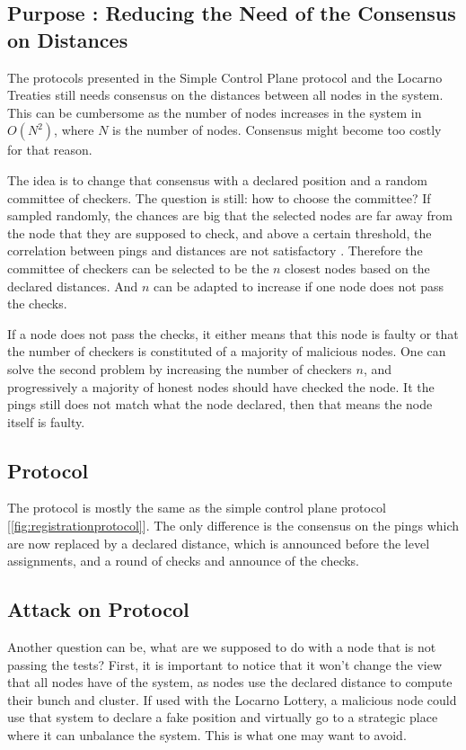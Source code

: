 \documentclass[a4paper,11pt,twoside=semi,openright]{report}
\begin{document}
\subsection{Purpose : Reducing the Need of the Consensus on Distances}
The protocols presented in the Simple Control Plane protocol and the Locarno
Treaties still needs consensus on the distances between all nodes in the system.
This can be cumbersome as the number of nodes increases in the system in $O(N^2)$, where $N$ is the number of nodes. Consensus
might become too costly for that reason.

The idea is to change that consensus with a declared position and a random
committee of checkers. The question is still: how to choose the committee? If
sampled randomly, the chances are big that the selected nodes are far away
from the node that they are supposed to check, and above a certain threshold,
the correlation between pings and distances are not satisfactory
\cite{Katz-bassett2006}. Therefore the committee of checkers can be selected to
be the $n$ closest nodes based on the declared distances. And $n$ can be
adapted to increase if one node does not pass the checks. 

If a node does not pass the checks, it either means that this node is faulty or
that the number of checkers is constituted of a majority of malicious nodes.
One can solve the second problem by increasing the number of checkers $n$, and
progressively a majority of honest nodes should have checked the node. It the
pings still does not match what the node declared, then that means the node itself is faulty. 

\subsection{Protocol}
The protocol is mostly the same as the simple control plane protocol
[\autoref{fig:registrationprotocol}]. The only difference is the consensus on
the pings which are now replaced by a declared distance, which is announced
before the level assignments,  and a round of checks and announce of the checks. 

\subsection{Attack on Protocol}
Another question can be, what are we supposed to do with a node that is not
passing the tests? First, it is important to notice that it won't change the
view that all nodes have of the system, as nodes use the declared distance
to compute their bunch and cluster. If used with the Locarno Lottery, a malicious node could use that system to declare a fake position and virtually go to a strategic place where it can unbalance the
system. This is what one may want to avoid. 
\end{document}
